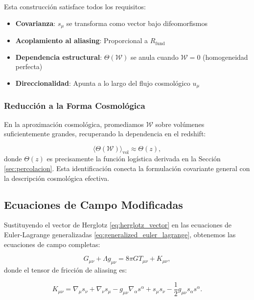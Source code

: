 \documentclass[12pt, a4paper]{article}
\theoremstyle{plain}
\theoremstyle{definition}
\begin{document}
Esta construcción satisface todos los requisitos:
\begin{itemize}
    \item \textbf{Covarianza}: $s_\mu$ se transforma como vector bajo difeomorfismos
    \item \textbf{Acoplamiento al aliasing}: Proporcional a $R_{\text{fund}}$
    \item \textbf{Dependencia estructural}: $\Theta(\mathcal{W})$ se anula cuando $\mathcal{W}=0$ (homogeneidad perfecta)
    \item \textbf{Direccionalidad}: Apunta a lo largo del flujo cosmológico $u_\mu$
\end{itemize}

\subsubsection{Reducción a la Forma Cosmológica}

En la aproximación cosmológica, promediamos $\mathcal{W}$ sobre volúmenes suficientemente grandes, recuperando la dependencia en el redshift:

\begin{equation}
\langle \Theta(\mathcal{W}) \rangle_{\text{vol}} \approx \Theta(z),
\end{equation}
donde $\Theta(z)$ es precisamente la función logística derivada en la Sección \ref{sec:percolacion}. Esta identificación conecta la formulación covariante general con la descripción cosmológica efectiva.

\subsection{Ecuaciones de Campo Modificadas}

Sustituyendo el vector de Herglotz \eqref{eq:herglotz_vector} en las ecuaciones de Euler-Lagrange generalizadas \eqref{eq:generalized_euler_lagrange}, obtenemos las ecuaciones de campo completas:

\begin{equation}
G_{\mu\nu} + \Lambda g_{\mu\nu} = 8\pi G T_{\mu\nu} + K_{\mu\nu},
\label{eq:full_field_eq}
\end{equation}
donde el tensor de fricción de aliasing es:

\begin{equation}
K_{\mu\nu} = \nabla_\mu s_\nu + \nabla_\nu s_\mu - g_{\mu\nu} \nabla_\alpha s^\alpha + s_\mu s_\nu - \frac{1}{2} g_{\mu\nu} s_\alpha s^\alpha.
\label{eq:friction_tensor}
\end{equation}
\end{document}
